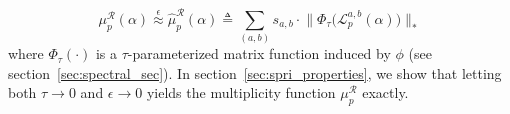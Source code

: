 \documentclass[10pt]{article}
\newenvironment{boxedenumerate}
  {\begin{mdframed}[font=\small, linewidth=1pt]}
  {\end{mdframed}}
\numberwithin{equation}{section}
\newcommand{\+}{%
	\raisebox{0.18ex}{\scaleobj{0.55}{+}}
}
\newcommand\restr[2]{{%
  \left.\kern-\nulldelimiterspace %
  #1 %
  \vphantom{\big|} %
  \right|_{#2} %
  }}
\theoremstyle{definition}
\theoremstyle{definition}
\begin{document}
\begin{boxedenumerate}
\begin{enumerate}
	$$
	\mu^\mathcal{R}_p(\alpha) \overset{\epsilon}{\approx} \hat{\mu}^\mathcal{R}_p(\alpha) \triangleq 
	\sum\limits_{(a,b)} s_{a,b} \cdot \lVert \Phi_{\tau}\big(\mathcal{L}_p^{a,b}(\alpha) \big) \rVert_\ast
	$$
where $\Phi_\tau(\cdot)$ is a $\tau$-parameterized matrix function induced by $\phi$ (see section~\ref{sec:spectral_sec}). In section~\ref{sec:spri_properties}, we show that letting both $\tau \to 0$ and $\epsilon \to 0$ yields the multiplicity function $\mu_p^\mathcal{R}$ exactly.
\end{enumerate}
\end{boxedenumerate}
\end{document}
